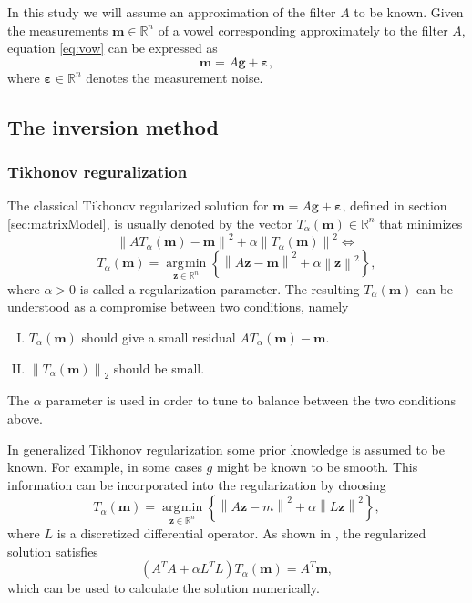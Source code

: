 \documentclass[12pt,a4]{article}
\DeclareMathOperator*{\argmin}{\arg\!\min}
\newcommand{\R}{{\mathbb R}}
\newcommand{\lnorm}{\left\|}
\newcommand{\rnorm}{\right\|}
\newcommand{\eps}{\ensuremath{\varepsilon}}
\newcommand{\vc}[1]{\ensuremath{\bm{#1}}}
\begin{document}
In this study we will assume an approximation of the filter $A$ to be known. Given the measurements $\vc{m} \in \R^n$ of a vowel corresponding approximately to the filter $A$, equation \eqref{eq:vow} can be expressed as
\begin{equation}
\label{eq:vowModel}
\vc{m} = A \vc{g} + \vc{\eps},
\end{equation}
where $\vc{\eps} \in \R^n$ denotes the measurement noise.


\subsection{The inversion method}
\label{sec:invMethod}

\subsubsection{Tikhonov reguralization}
\label{sec:tikh}
The classical Tikhonov regularized solution for $\vc{m} = A \vc{g} + \vc{\eps}$, defined in section \ref{sec:matrixModel}, is usually denoted by the vector $T_\alpha( \vc{m} ) \in \R^n$ that minimizes
\begin{equation*}
\lnorm AT_\alpha( \vc{m} ) - \vc{m} \rnorm^2 + \alpha \lnorm T_\alpha( \vc{m} ) \rnorm^2 \Leftrightarrow
\end{equation*}
\begin{equation*}
T_\alpha( \vc{m} ) = \underset{ \vc{z} \in \R^n}{\argmin}
\left\{ \lnorm A \vc{z} - \vc{m} \rnorm^2 + \alpha \lnorm \vc{z} \rnorm^2 \right\},
\end{equation*}
where $\alpha > 0$ is called a regularization parameter. The resulting $T_\alpha( \vc{m} )$ can be understood as a compromise between two conditions, namely
\begin{enumerate}[I.]
 \item $T_\alpha( \vc{m} )$ should give a small residual $AT_\alpha( \vc{m} ) - \vc{m}$.
 \item $\lnorm T_\alpha( \vc{m} ) \rnorm_2$ should be small.
\end{enumerate}
The $\alpha$ parameter is used in order to tune to balance between the two conditions above.

In generalized Tikhonov regularization some prior knowledge is assumed to be known. For example, in some cases $g$ might be known to be smooth. This information can be incorporated into the regularization by choosing
\begin{equation}
T_\alpha( \vc{m} ) = \underset{\vc{z} \in \R^n}{\argmin}
\left\{ \lnorm A \vc{z} - m \rnorm^2 + \alpha \lnorm L \vc{z} \rnorm^2 \right\},
\end{equation}  
where $L$ is a discretized differential operator. As shown in \cite{samu}, the regularized solution satisfies
\begin{equation}
\label{eq:tik-normal}
\left( A^T A + \alpha L^T L \right) T_{\alpha}( \vc{m} ) = A^T \vc{m} ,
\end{equation}
which can be used to calculate the solution numerically.
 
\end{document}
